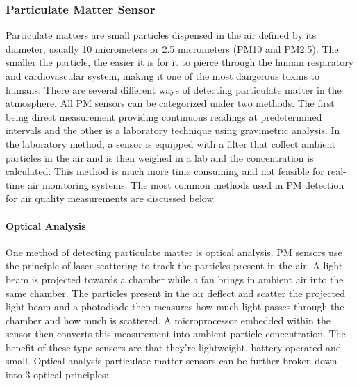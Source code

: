 


\subsubsection{Particulate Matter Sensor}
Particulate matters are small particles dispensed in the air defined by its diameter, usually 10 micrometers or 2.5 micrometers (PM10 and PM2.5). The smaller the particle, the easier it is for it to pierce through the human respiratory and cardiovascular system, making it one of the most dangerous toxins to humans. There are several different ways of detecting particulate matter in the atmosphere. All PM sensors can be categorized under two methods. The first being direct measurement providing continuous readings at predetermined intervals and the other is a laboratory technique using gravimetric analysis. In the laboratory method, a sensor is equipped with a filter that collect ambient particles in the air and is then weighed in a lab and the concentration is calculated. This method is much more time consuming and not feasible for real-time air monitoring systems. The most common methods used in PM detection for air quality measurements are discussed below.

\paragraph{Optical Analysis}
 One method of detecting particulate matter is optical analysis. PM sensors use the principle of laser scattering to track the particles present in the air. A light beam is projected towards a chamber while a fan brings in ambient air into the same chamber. The particles present in the air deflect and scatter the projected light beam and a photodiode then measures how much light passes through the chamber and how much is scattered. A microprocessor embedded within the sensor then converts this measurement into ambient particle concentration. The benefit of these type sensors are that they’re lightweight, battery-operated and small. Optical analysis particulate matter sensors can be further broken down into 3 optical principles:

